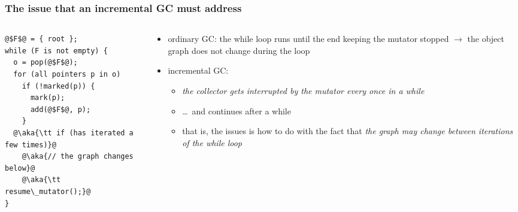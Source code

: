 \documentclass[11pt,dvipdfmx]{beamer}
\newcommand{\ao}[1]{{\color{blue}#1}}
\newcommand{\aka}[1]{{\color{red}#1}}
\begin{document}
\begin{frame}[fragile]
\frametitle{The issue that an incremental GC must address}
\begin{columns}
\begin{column}{0.45\textwidth}
\begin{lstlisting}
@$F$@ = { root };
while (F is not empty) {
  o = pop(@$F$@);
  for (all pointers p in o)
    if (!marked(p)) {
      mark(p);
      add(@$F$@, p);
    }
  @\aka{\tt if (has iterated a few times)}@
    @\aka{// the graph changes below}@
    @\aka{\tt resume\_mutator();}@
}
\end{lstlisting}
\end{column}
\begin{column}{0.6\textwidth}
  \begin{itemize}
  \item \ao{ordinary GC:} the while loop runs until the end
    keeping the mutator stopped
    $\rightarrow$ the object graph does not change during the loop
  \item \aka{incremental GC:}
    \begin{itemize}
    \item \aka{\it the collector gets interrupted by the mutator
      every once in a while}
    \item \ldots\ and continues after a while
    \item that is, the issues is
      how to do with the fact that
      \aka{\it the graph may change between iterations of the while loop}
    \end{itemize}
  \end{itemize}
\end{column}  
\end{columns}
\end{frame}
\fi
\end{document}
